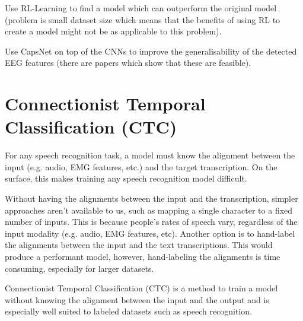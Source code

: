 Use RL-Learning to find a model which can outperform the original model
(problem is small dataset size which means that the benefits of using RL
to create a model might not be as applicable to this problem).

Use CapsNet on top of the CNNs to improve the generalisability of the
detected EEG features (there are papers which show that these are
feasible).

\section{Connectionist Temporal Classification (CTC)}

For any speech recognition task, a model must know the alignment
between the input (e.g. audio, EMG features, etc.) and the target
transcription. On the surface, this makes training any speech
recognition model difficult.

Without having the alignments between the input and the transcription,
simpler approaches aren't available to us, such as mapping a single
character to a fixed number of inputs. This is because people's rates
of speech vary, regardless of the input modality (e.g. audio, EMG features,
etc). Another option is to hand-label the alignments between the input
and the text transcriptions. This would produce a performant model, however,
hand-labeling the alignments is time consuming, especially for larger datasets.

Connectionist Temporal Classification (CTC) is a method to train a model
without knowing the alignment between the input and the output and is especially
well suited to labeled datasets such as speech recognition.